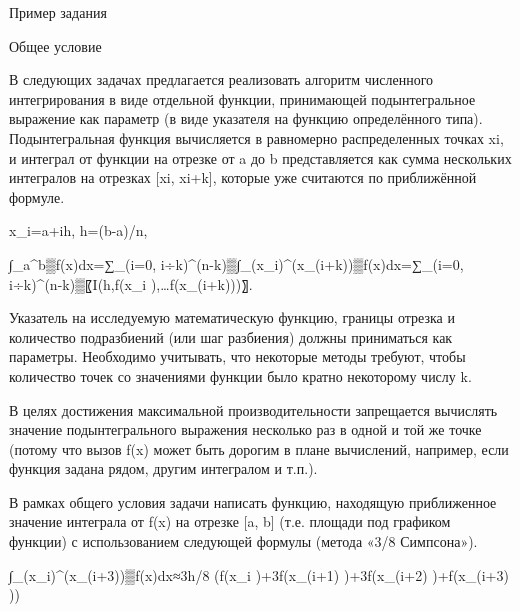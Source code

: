 Пример задания

Общее условие

В следующих задачах предлагается реализовать алгоритм численного
интегрирования в виде отдельной функции, принимающей подынтегральное выражение
как параметр (в виде указателя на функцию определённого типа). Подынтегральная
функция вычисляется в равномерно распределенных точках xi, и интеграл от
функции на отрезке от a до b представляется как сумма нескольких интегралов на
отрезках [xi, xi+k], которые уже считаются по приближённой формуле.

x_i=a+ih,    h=(b-a)/n,

∫_a^b▒f(x)dx=∑_(i=0,   i÷k)^(n-k)▒∫_(x_i)^(x_(i+k))▒f(x)dx=∑_(i=0, i÷k)^(n-k)▒〖I(h,f(x_i ),…f(x_(i+k)))〗.

Указатель на исследуемую математическую функцию, границы отрезка и количество
подразбиений (или шаг разбиения) должны приниматься как параметры. Необходимо
учитывать, что некоторые методы требуют, чтобы количество точек со значениями
функции было кратно некоторому числу k.

В целях достижения максимальной производительности запрещается вычислять
значение подынтегрального выражения несколько раз в одной и той же точке
(потому что вызов f(x) может быть дорогим в плане вычислений, например, если
функция задана рядом, другим интегралом и т.п.).

В рамках общего условия задачи написать функцию, находящую приближенное
значение интеграла от f(x) на отрезке [a, b] (т.е. площади под графиком
функции) с использованием следующей формулы (метода «3/8 Симпсона»).

∫_(x_i)^(x_(i+3))▒f(x)dx≈3h/8 (f(x_i )+3f(x_(i+1) )+3f(x_(i+2) )+f(x_(i+3) ))
